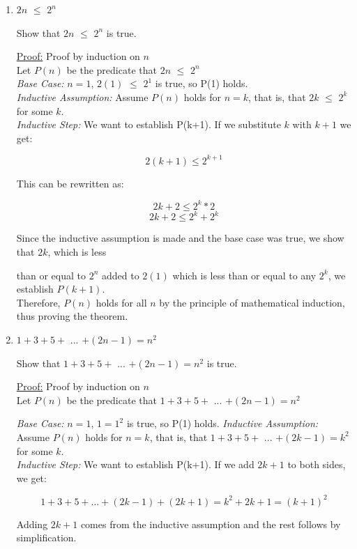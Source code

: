 \documentclass[11pt]{article}
\begin{document}
	\begin{enumerate}
		\item $2n$ $\leq$ $2^n$

			Show that $2n$ $\leq$ $2^n$ is true.

			\underline{Proof:} Proof by induction on $n$\\

			Let $P(n)$ be the predicate that $2n$ $\leq$ $2^n$\\

			\textit{Base Case:} $n=1$, $2(1)$ $\leq$ $2^1$ is true, so P(1) holds. \\
			\textit{Inductive Assumption:} Assume $P(n)$ holds for $n = k$, that is, that $2k$ $\leq$ $2^k$ for some $k$.\\
			\textit{Inductive Step:} We want to establish P(k+1). If we substitute $k$ with $k+1$ we get: 

			\[2(k+1)  \leq 2^{k+1}\]

			This can be rewritten as:

			\[2k+2 \leq 2^k * 2\]
			\[2k+2 \leq 2^k + 2^k\]

			Since the inductive assumption is made and the base case was true, we show that $2k$, which is less 

			than or equal to $2^n$ added to $2(1)$ which is less than or equal to any $2^k$, we establish $P(k+1)$.\\

			Therefore, $P(n)$ holds for all $n$ by the principle of mathematical induction, thus proving the theorem. 
		\newpage
		\item $1+3+5+$ ... $+(2n-1)=n^2$

			Show that $1+3+5+$ ... $+(2n-1)=n^2$ is true.

			\underline{Proof:} Proof by induction on $n$\\

			Let $P(n)$ be the predicate that $1+3+5+$ ... $+(2n-1)=n^2$

			\textit{Base Case:} $n=1$, $1 = 1^2$ is true, so P(1) holds.
			\textit{Inductive Assumption:} Assume $P(n)$ holds for $n = k$, that is, that $1+3+5+$ ... $+(2k-1)=k^2$ for some $k$.\\
			\textit{Inductive Step:} We want to establish P(k+1). If we add $2k+1$ to both sides, we get:

			\[1+3+5+ ... +(2k-1)+(2k+1) = k^2+2k+1 = (k+1)^2\]
			
			Adding $2k+1$ comes from the inductive assumption and the rest follows by simplification.\\


\end{enumerate}
\end{document}
